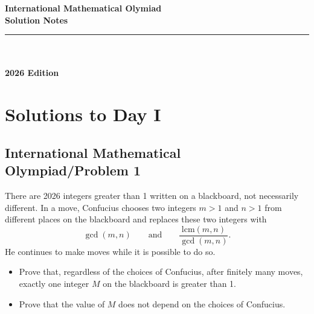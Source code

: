 \documentclass[11pt]{article}
\begin{document}

\begin{titlepage}
    
    \vspace*{3em}
    \begin{center}
        {\Huge \textbf{International Mathematical Olymiad}\\[1.5cm]}
        {\LARGE \textbf{Solution Notes}\\[1.5cm]}
        \textcolor{GlacierBlue}{\rule{0.5\textwidth}{1pt}} \\[1.75cm]
        {\Huge {}} \\[9cm]
        {\LARGE \textbf{2026 Edition}}\\[1cm]
    \end{center}
    
    \vfill
\end{titlepage}
\newpage
\thispagestyle{empty}
\null
\newpage
\tableofcontents
\newpage
\thispagestyle{empty}
\null
\newpage
\section{Solutions to Day I}
\subsection{International Mathematical Olympiad/Problem 1}
\begin{problem*}
    There are 2026 integers greater than 1 written on a blackboard, not necessarily different. In a move, Confucius chooses two integers $m > 1$ and $n > 1$ from different places on the blackboard and replaces these two integers with
\[
\gcd(m,n) \qquad \text{and} \qquad \frac{\text{lcm}(m,n)}{\gcd(m,n)}.
\]
He continues to make moves while it is possible to do so.

\begin{itemize}
    \item[(a)] Prove that, regardless of the choices of Confucius, after finitely many moves, exactly one integer $M$ on the blackboard is greater than 1.
    \item[(b)] Prove that the value of $M$ does not depend on the choices of Confucius.
\end{itemize}
\end{problem*}
\end{document}
